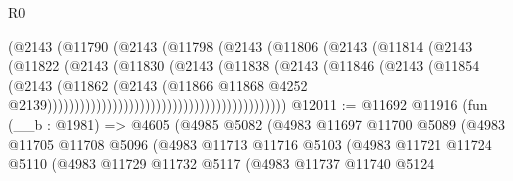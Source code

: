 \begin{lexlean}{R0}
\begin{coremodule}
                                                (@2143
                                                  (@11790
                                                    (@2143
                                                      (@11798
                                                        (@2143
                                                          (@11806
                                                            (@2143
                                                              (@11814
                                                                (@2143
                                                                  (@11822
                                                                    (@2143
                                                                      (@11830
                                                                        (@2143
                                                                          (@11838
                                                                            (@2143
                                                                              (@11846
                                                                                (@2143
                                                                                  (@11854
                                                                                    (@2143
                                                                                      (@11862
                                                                                        (@2143
                                                                                          (@11866
                                                                                            @11868
                                                                                            @4252
                                                                                            @2139))))))))))))))))))))))))))))))))))))))))))))
@12011 := @11692
    @11916
    (fun (__b : @1981) =>
    @4605
      (@4985
        @5082
        (@4983
          @11697
          @11700
          @5089
          (@4983
            @11705
            @11708
            @5096
            (@4983
              @11713
              @11716
              @5103
              (@4983
                @11721
                @11724
                @5110
                (@4983
                  @11729
                  @11732
                  @5117
                  (@4983
                    @11737
                    @11740
                    @5124

\end{coremodule}
\end{lexlean}
